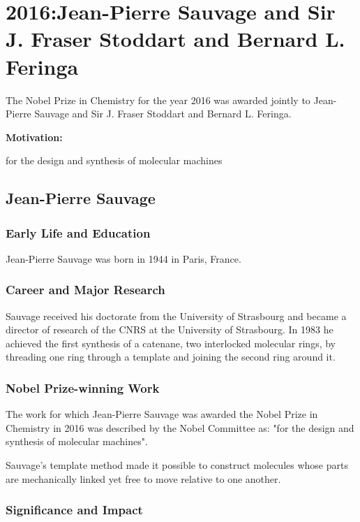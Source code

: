 \chapter{2016:Jean-Pierre Sauvage and Sir J. Fraser Stoddart and Bernard L. Feringa}

\label{chap:chemistry2016}

The Nobel Prize in Chemistry for the year 2016 was awarded jointly to Jean-Pierre Sauvage and Sir J. Fraser Stoddart and Bernard L. Feringa.

\textbf{Motivation:}

for the design and synthesis of molecular machines

\section{Jean-Pierre Sauvage}

\subsection*{Early Life and Education}

Jean-Pierre Sauvage was born in 1944 in Paris, France.

\subsection*{Career and Major Research}

Sauvage received his doctorate from the University of Strasbourg and became a director of research of the CNRS at the University of Strasbourg. In 1983 he achieved the first synthesis of a catenane, two interlocked molecular rings, by threading one ring through a template and joining the second ring around it.

\subsection*{Nobel Prize-winning Work}

The work for which Jean-Pierre Sauvage was awarded the Nobel Prize in Chemistry in 2016 was described by the Nobel Committee as: "for the design and synthesis of molecular machines".

Sauvage's template method made it possible to construct molecules whose parts are mechanically linked yet free to move relative to one another.

\subsection*{Significance and Impact}

